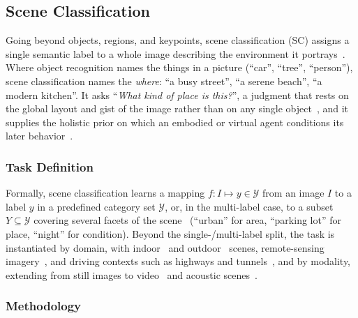 


\subsection{Scene Classification}
\label{sec:scene_classification}


Going beyond objects, regions, and keypoints, scene classification (SC) assigns a single semantic label to a whole image describing the environment it portrays~\cite{zeng2021deep}.
Where object recognition names the things in a picture (``car'', ``tree'', ``person''), scene classification names the \emph{where}: ``a busy street'', ``a serene beach'', ``a modern kitchen''.
It asks ``\emph{What kind of place is this?}'', a judgment that rests on the global layout and gist of the image rather than on any single object~\cite{henderson1999high,epstein2005cortical}, and it supplies the holistic prior on which an embodied or virtual agent conditions its later behavior~\cite{liao2016understand,ni2022improved,muhammad2022vision,Zhang2024UrbanVI}.


\subsubsection{Task Definition}

Formally, scene classification learns a mapping $f: I \mapsto y \in \mathcal{Y}$ from an image $I$ to a label $y$ in a predefined category set $\mathcal{Y}$, or, in the multi-label case, to a subset $Y \subseteq \mathcal{Y}$ covering several facets of the scene~\cite{boutell2004learning} (``urban'' for area, ``parking lot'' for place, ``night'' for condition).
Beyond the single-/multi-label split, the task is instantiated by domain, with indoor~\cite{quattoni2009recognizing} and outdoor~\cite{6724252} scenes, remote-sensing imagery~\cite{nogueira2017towards,cheng2017remote}, and driving contexts such as highways and tunnels~\cite{ni2022improved}, and by modality, extending from still images to video~\cite{huang1999integration} and acoustic scenes~\cite{mesaros2018multi}.


\subsubsection{Methodology}

